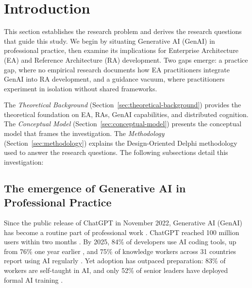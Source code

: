 \section{Introduction}\label{sec:introduction}

This section establishes the research problem and derives the research
questions that guide this study. We begin by situating Generative AI (GenAI)
in professional practice, then examine its implications for Enterprise
Architecture (EA) and Reference Architecture (RA) development. Two gaps
emerge: a practice gap, where no empirical research documents how EA
practitioners integrate GenAI into RA development, and a guidance vacuum,
where practitioners experiment in isolation without shared frameworks.

The \textit{Theoretical Background} (Section~\ref{sec:theoretical-background}) provides the theoretical foundation
on EA, RAs, GenAI capabilities, and distributed cognition.
The \textit{Conceptual Model} (Section~\ref{sec:conceptual-model}) presents the conceptual model that frames
the investigation. The \textit{Methodology} (Section~\ref{sec:methodology}) explains the Design-Oriented
Delphi methodology used to answer the research questions. The following
subsections detail this investigation:

\localtableofcontents\clearpage

\subsection{The emergence of Generative AI in Professional Practice}

Since the public release of ChatGPT in November 2022, Generative AI (GenAI) has
become a routine part of professional work
\parencite{brynjolfsson_generative_2025}. ChatGPT reached 100 million users
within two months \parencite{hu_chatgpt_2023}. By 2025, 84\% of developers use
AI coding tools, up from 76\% one year earlier
\parencite{stack_overflow_2024, stack_overflow_2025}, and 75\% of knowledge
workers across 31 countries report using AI regularly
\parencite{microsoft_wti_2025}. Yet adoption has outpaced preparation: 83\% of
workers are self-taught in AI, and only 52\% of senior leaders have deployed
formal AI training \parencite{ey_agentic_2025}.

